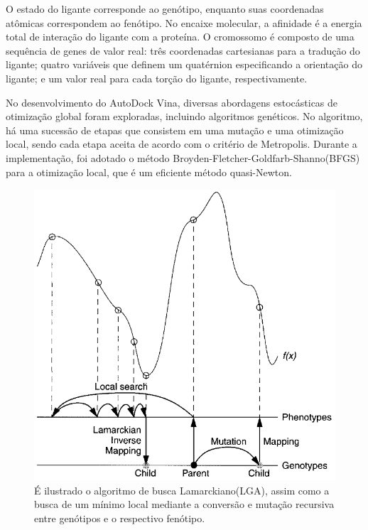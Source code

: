 O estado do ligante corresponde ao genótipo, enquanto suas coordenadas atômicas correspondem ao fenótipo. No encaixe molecular, a afinidade é a energia total de interação do ligante com a proteína. O cromossomo é composto de uma sequência de genes de valor real: três coordenadas cartesianas para a tradução do ligante; quatro variáveis que definem um quatérnion especificando a orientação do ligante; e um valor real para cada torção do ligante, respectivamente. 

No desenvolvimento do AutoDock Vina, diversas abordagens estocásticas de otimização global foram exploradas, incluindo algoritmos genéticos. No algoritmo, há uma sucessão de etapas que consistem em uma mutação e uma otimização local, sendo cada etapa aceita de acordo com o critério de Metropolis. Durante a implementação, foi adotado o método Broyden-Fletcher-Goldfarb-Shanno(BFGS) para a otimização local, que é um eficiente método quasi-Newton. \cite{Vina2010}

\begin{figure}[H]
\centering
\includegraphics[scale=1.35]{Figuras/lga_search.png}
\caption{É ilustrado o algoritmo de busca Lamarckiano(LGA), assim como a busca de um mínimo local mediante a conversão e mutação recursiva entre genótipos e o respectivo fenótipo. \cite{Autodock1998}}
\end{figure}

